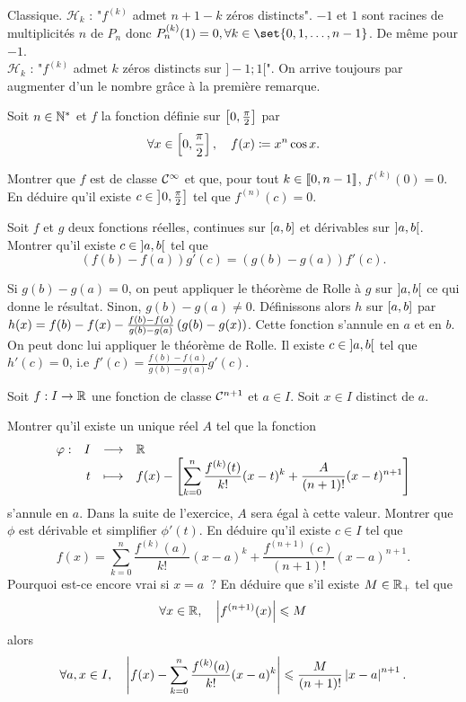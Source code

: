\documentclass{magnolia}
\begin{document}



\begin{sol}
\begin{questions}
\question Classique. $\mathcal{H}_k$ : "$f^{(k)}$ admet $n+1-k$ zéros distincts".
\question $-1$ et $1$ sont racines de multiplicités $n$ de $P_n$ donc $P_n^{(k)}(1)=0,  \forall k \in \set{0,1,\ldots,n-1}$. De même pour $-1$.\\
$\mathcal{H}_k$ : "$f^{(k)}$ admet $k$ zéros distincts sur $]-1;1[$". On arrive toujours par augmenter d'un le nombre grâce à la première remarque.
\end{questions}

\end{sol}

Soit $n\in{\mathbb{N}^*}$ et $f$ la fonction définie sur $\left[0,\frac{\pi}{2}\right]$ par
  \[\forall x\in\left[0,\frac{\pi}{2}\right] ,\quad f(x)\coloneqq x^n\cos x.\]
  \begin{questions}
  \question Montrer que $f$ est de classe $\mathcal{C}^{\infty}$ et que, pour tout $k\in\left\llbracket 0,n-1\right\rrbracket$, $f^{(k)}(0)=0$.
  \question En déduire qu'il existe $c\in\left]0,\frac{\pi}{2}\right]$ tel que $f^{(n)}(c)=0$.
  \end{questions}

Soit $f$ et $g$ deux fonctions réelles, continues sur $\left[a,b\right]$ et
dérivables sur $\left]a,b\right[$. Montrer qu'il existe $c\in\left]a,b\right[$ tel
que
\[(f(b)-f(a))g'(c)=(g(b)-g(a))f'(c).\]

\begin{sol}
Si $g(b)-g(a)=0$, on peut appliquer le théorème de Rolle à $g$ sur $\left]a,b\right[$ ce qui donne le résultat. Sinon, $g(b)-g(a)\neq 0$.
Définissons alors $h$ sur $\left[a,b\right]$ par $h(x)=f(b)-f(x)-\frac{f(b)-f(a)}{g(b)-g(a)}\left(g(b)-g(x)\right)$. Cette fonction s'annule en $a$ et en $b$. On peut donc lui appliquer le théorème de Rolle. Il existe $c\in \left]a,b\right[$ tel que $h'(c)=0$, i.e $f'(c)=\frac{f(b)-f(a)}{g(b)-g(a)}g'(c)$.
\end{sol}

Soit $f:I\to\mathbb{R}$ une fonction de classe $\mathcal{C}^{n+1}$ et $a\in I$. Soit $x\in I$ distinct
de $a$.
\begin{questions}
\question Montrer qu'il existe un unique réel $A$ tel que la fonction
  \[\begin{array}[t]{lrcl} \displaystyle{\varphi} : & \displaystyle{I} & \longrightarrow & \displaystyle{\mathbb{R}} \\ & \displaystyle{t} & \longmapsto & \displaystyle{f(x)-\left[\sum_{k=0}^n \frac{f^{(k)}(t)}{k!}(x-t)^k+\frac{A}{(n+1)!}(x-t)^{n+1}\right]} \end{array}\]
  s'annule en $a$.
\enonce Dans la suite de l'exercice, $A$ sera égal à cette valeur.
\question Montrer que $\phi$ est dérivable et simplifier $\phi'(t)$.
\question En déduire qu'il existe $c\in I$ tel que
  \[f(x)=\sum_{k=0}^n \frac{f^{(k)}(a)}{k!}(x-a)^k+\frac{f^{(n+1)}(c)}{(n+1)!}(x-a)^{n+1}.\]
  Pourquoi est-ce encore vrai si $x=a$~?
\question En déduire que s'il existe $M\in\mathbb{R}_+$ tel que
  \[\forall x\in\mathbb{R},\quad \left|f^{(n+1)}(x)\right|\leqslant M\]
  alors
  \[\forall a,x\in I,\quad \left|f(x)-\sum_{k=0}^n \frac{f^{(k)}(a)}{k!}(x-a)^k\right|\leqslant \frac{M  }{(n+1)!}\left|x-a\right|^{n+1}.\]
\end{questions}
\end{document}
